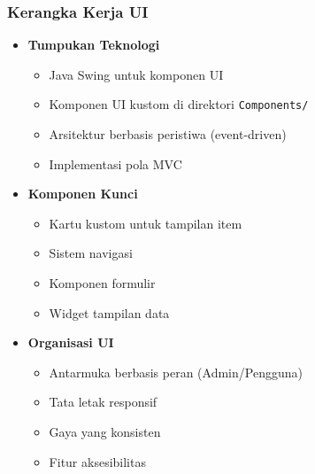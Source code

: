 \documentclass[12pt,a4paper]{article}
\begin{document}
\subsubsection{Kerangka Kerja UI}
\begin{itemize}
    \item \textbf{Tumpukan Teknologi}
    \begin{itemize}
        \item Java Swing untuk komponen UI
        \item Komponen UI kustom di direktori \texttt{Components/}
        \item Arsitektur berbasis peristiwa (event-driven)
        \item Implementasi pola MVC
    \end{itemize}
    
    \item \textbf{Komponen Kunci}
    \begin{itemize}
        \item Kartu kustom untuk tampilan item
        \item Sistem navigasi
        \item Komponen formulir
        \item Widget tampilan data
    \end{itemize}
    
    \item \textbf{Organisasi UI}
    \begin{itemize}
        \item Antarmuka berbasis peran (Admin/Pengguna)
        \item Tata letak responsif
        \item Gaya yang konsisten
        \item Fitur aksesibilitas
    \end{itemize}
\end{itemize}
\end{document}
